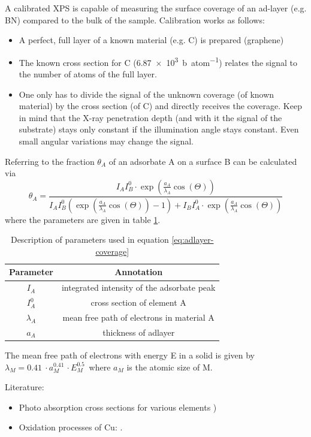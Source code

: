 A calibrated XPS is capable of measuring the surface coverage of an ad-layer (e.g. BN) compared to the bulk of the sample. Calibration works as follows:
\begin{itemize}
 \item A perfect, full layer of a known material (e.g. C) is prepared (graphene)
 \item The known cross section for C (\SI{6,87e3}{\barn\per atom})\cite{henke_x-ray_1993} relates the signal to the number of atoms of the full layer.
 \item One only has to divide the signal of the unknown coverage (of known material) by the cross section (of C) and directly receives the coverage. Keep in mind that the X-ray penetration depth (and with it the signal of the substrate) stays only constant if the illumination angle stays constant. Even small angular variations may change the signal.
\end{itemize}
Referring to \cite{ertl_low_1986} the fraction $\theta_A$ of an adsorbate A on a surface B can be calculated via
\begin{equation}\label{eq:adlayer-coverage}
 \theta_A=\frac{I_AI_B^0\cdot \exp(\frac{a_A}{\lambda_A}\cos(\Theta))}{I_AI_B^0( \exp(\frac{a_A}{\lambda_A}\cos(\Theta))-1)+I_BI_A^0\cdot \exp(\frac{a_A}{\lambda_A}\cos(\Theta))}
\end{equation}
where the parameters are given in table \ref{tab:adlayer-coverage-parameters}.
\begin{table}[h!]\centering
\caption{Description of parameters used in equation
\ref{eq:adlayer-coverage}}
\label{tab:adlayer-coverage-parameters}
 \begin{tabular}{cc}
  Parameter & Annotation \\ \hline \hline
  $I_A$	& integrated intensity of the adsorbate peak \\
  $I_A^0$ & cross section of element A \\
  $\lambda_A$ & mean free path of electrons in material A \\
  $a_A$ & thickness of adlayer \\
 \end{tabular}
\end{table}
The mean free path of electrons with energy E in a solid is given by $\lambda_M=\SI{0,41}{}\cdot a_M^{\SI{0,41}{}}\cdot E_M^{\SI{0,5}{}} $ where $a_M$ is the atomic size of M. 

Literature:
\begin{itemize}
 \item Photo absorption cross sections for various elements \cite{henke_x-ray_1993})
 \item Oxidation processes of Cu: \cite{deroubaix_x-ray_1992}.
\end{itemize}
